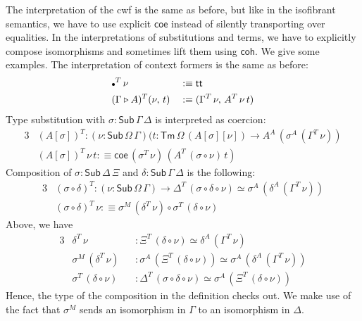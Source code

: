 \documentclass[12pt,a4paper,twoside,openany]{book}
\theoremstyle{remark}
\theoremstyle{definition}
\theoremstyle{theorem}
\newcommand{\Sub}{\mathsf{Sub}}
\newcommand{\Tm}{\mathsf{Tm}}
\renewcommand{\tt}{\mathsf{tt}}
\newcommand{\ext}{\triangleright}
\newcommand{\emptycon}{\scaleobj{.75}\bullet}
\newcommand{\coe}{\mathsf{coe}}
\newcommand{\coh}{\mathsf{coh}}
\newcommand{\defn}{:\equiv}
\begin{document}
The interpretation of the cwf is the same as before, but like in the isofibrant
semantics, we have to use explicit $\coe$ instead of silently transporting over
equalities. In the interpretations of substitutions and terms, we have to
explicitly compose isomorphisms and sometimes lift them using $\coh$. We give
some examples. The interpretation of context formers is the same as before:
\begin{alignat*}{3}
  &\emptycon^T\,\nu           &&\defn \tt\\
  &(\Gamma \ext A)^T(\nu,\,t) &&\defn (\Gamma^T\,\nu,\,A^T\,\nu\,t)
\end{alignat*}
Type substitution with $\sigma : \Sub\,\Gamma\,\Delta$ is
interpreted as coercion:
\begin{alignat*}{3}
  &(A[\sigma])^T : (\nu : \Sub\,\Omega\,\Gamma)(t : \Tm\,\Omega\,(A[\sigma][\nu]) \to A^A\,(\sigma^A\,(\Gamma^T\,\nu)) \\
  &(A[\sigma])^T\,\nu\,t \defn \coe\,(\sigma^T\,\nu)\,(A^T\,(\sigma\circ\nu)\,t)
\end{alignat*}
Composition of $\sigma : \Sub\,\Delta\,\Xi$ and $\delta : \Sub\,\Gamma\,\Delta$
is the following:
\begin{alignat*}{3}
  &(\sigma \circ \delta)^T : (\nu : \Sub\,\Omega\,\Gamma) \to \Delta^T\,(\sigma\circ\delta\circ\nu) \simeq \sigma^A\,(\delta^A\,(\Gamma^T\,\nu))\\
  &(\sigma \circ \delta)^T\,\nu \defn \sigma^M\,(\delta^T\,\nu) \circ \sigma^T\,(\delta\circ\nu)
\end{alignat*}
Above, we have
\begin{alignat*}{3}
& \delta^T\,\nu &&: \Xi^T\,(\delta\circ\nu) \simeq \delta^A\,(\Gamma^T\,\nu)\\
& \sigma^M\,(\delta^T\,\nu) &&: \sigma^A\,(\Xi^T\,(\delta\circ\nu)) \simeq \sigma^A\,(\delta^A\,(\Gamma^T\,\nu))\\
& \sigma^T\,(\delta\circ\nu) &&: \Delta^T\,(\sigma\circ\delta\circ\nu) \simeq \sigma^A\,(\Xi^T\,(\delta\circ \nu))
\end{alignat*}
Hence, the type of the composition in the definition checks out. We make use of
the fact that $\sigma^M$ sends an isomorphism in $\Gamma$ to an isomorphism in
$\Delta$.
\end{document}
